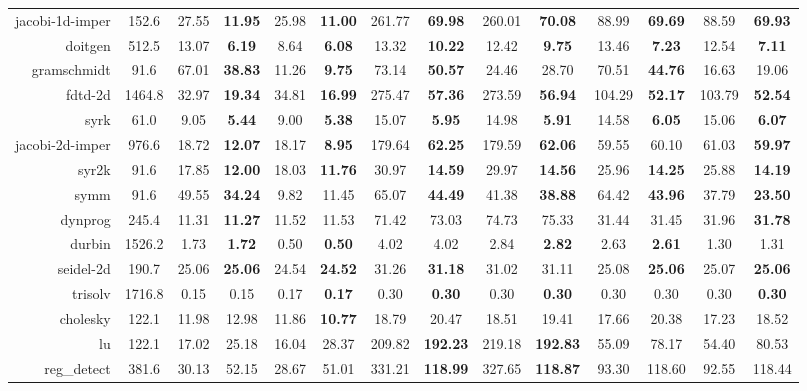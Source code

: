 \begin{table*}[!hb]
\begin{adjustbox}{max width=\textwidth}
\begin{tabular}{r|S|SS|SS|SS|SS|SS|SS}
      \tabularnewline
      jacobi-1d-imper & 152.6 & 27.55 & \textbf{11.95} & 25.98 & \textbf{11.00} & 261.77 & \textbf{69.98} & 260.01 & \textbf{70.08} & 88.99 & \textbf{69.69} & 88.59 & \textbf{69.93}
      \tabularnewline
      doitgen & 512.5 & 13.07 & \textbf{6.19} & 8.64 & \textbf{6.08} & 13.32 & \textbf{10.22} & 12.42 & \textbf{9.75} & 13.46 & \textbf{7.23} & 12.54 & \textbf{7.11}
      \tabularnewline
      gramschmidt & 91.6 & 67.01 & \textbf{38.83} & 11.26 & \textbf{9.75} & 73.14 & \textbf{50.57} & 24.46 & 28.70 & 70.51 & \textbf{44.76} & 16.63 & 19.06
      \tabularnewline
      fdtd-2d & 1464.8 & 32.97 & \textbf{19.34} & 34.81 & \textbf{16.99} & 275.47 & \textbf{57.36} & 273.59 & \textbf{56.94} & 104.29 & \textbf{52.17} & 103.79 & \textbf{52.54}
      \tabularnewline
      syrk & 61.0 & 9.05 & \textbf{5.44} & 9.00 & \textbf{5.38} & 15.07 & \textbf{5.95} & 14.98 & \textbf{5.91} & 14.58 & \textbf{6.05} & 15.06 & \textbf{6.07}
      \tabularnewline
      jacobi-2d-imper & 976.6 & 18.72 & \textbf{12.07} & 18.17 & \textbf{8.95} & 179.64 & \textbf{62.25} & 179.59 & \textbf{62.06} & 59.55 & 60.10 & 61.03 & \textbf{59.97}
      \tabularnewline
      syr2k & 91.6 & 17.85 & \textbf{12.00} & 18.03 & \textbf{11.76} & 30.97 & \textbf{14.59} & 29.97 & \textbf{14.56} & 25.96 & \textbf{14.25} & 25.88 & \textbf{14.19}
      \tabularnewline
      symm & 91.6 & 49.55 & \textbf{34.24} & 9.82 & 11.45 & 65.07 & \textbf{44.49} & 41.38 & \textbf{38.88} & 64.42 & \textbf{43.96} & 37.79 & \textbf{23.50}
      \tabularnewline
      dynprog & 245.4 & 11.31 & \textbf{11.27} & 11.52 & 11.53 & 71.42 & 73.03 & 74.73 & 75.33 & 31.44 & 31.45 & 31.96 & \textbf{31.78}
      \tabularnewline
      durbin & 1526.2 & 1.73 & \textbf{1.72} & 0.50 & \textbf{0.50} & 4.02 & 4.02 & 2.84 & \textbf{2.82} & 2.63 & \textbf{2.61} & 1.30 & 1.31
      \tabularnewline
      seidel-2d & 190.7 & 25.06 & \textbf{25.06} & 24.54 & \textbf{24.52} & 31.26 & \textbf{31.18} & 31.02 & 31.11 & 25.08 & \textbf{25.06} & 25.07 & \textbf{25.06}
      \tabularnewline
      trisolv & 1716.8 & 0.15 & 0.15 & 0.17 & \textbf{0.17} & 0.30 & \textbf{0.30} & 0.30 & \textbf{0.30} & 0.30 & 0.30 & 0.30 & \textbf{0.30}
      \tabularnewline
      cholesky & 122.1 & 11.98 & 12.98 & 11.86 & \textbf{10.77} & 18.79 & 20.47 & 18.51 & 19.41 & 17.66 & 20.38 & 17.23 & 18.52
      \tabularnewline
      lu & 122.1 & 17.02 & 25.18 & 16.04 & 28.37 & 209.82 & \textbf{192.23} & 219.18 & \textbf{192.83} & 55.09 & 78.17 & 54.40 & 80.53
      \tabularnewline
      reg\_detect & 381.6 & 30.13 & 52.15 & 28.67 & 51.01 & 331.21 & \textbf{118.99} & 327.65 & \textbf{118.87} & 93.30 & 118.60 & 92.55 & 118.44
      \tabularnewline
    \end{tabular}
  \end{adjustbox}
\end{table*}
